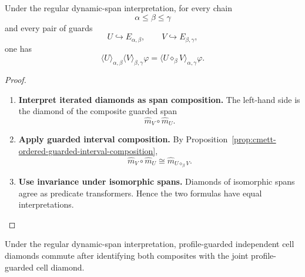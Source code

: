 \begin{theorem}
\label{thm:cmett-soundness-ordered-cell-composition}
    Under the regular dynamic-span interpretation, for every chain
    \[
        \alpha\leq\beta\leq\gamma
    \]
    and every pair of guards
    \[
        U\hookrightarrow E_{\alpha,\beta},
        \qquad
        V\hookrightarrow E_{\beta,\gamma},
    \]
    one has
    \[
        \langle U\rangle_{\alpha,\beta}
        \langle V\rangle_{\beta,\gamma}
        \varphi
        =
        \langle U\diamond_\beta V\rangle_{\alpha,\gamma}\varphi.
    \]
\end{theorem}

\begin{proof}
    \leavevmode
    \begin{enumerate}
        \item \textbf{Interpret iterated diamonds as span composition.}
        The left-hand side is the diamond of the composite guarded span
        \[
            \widehat m_V\circ\widehat m_U.
        \]

        \item \textbf{Apply guarded interval composition.}
        By Proposition~\ref{prop:cmett-ordered-guarded-interval-composition},
        \[
            \widehat m_V\circ\widehat m_U
            \cong
            \widehat m_{U\diamond_\beta V}.
        \]

        \item \textbf{Use invariance under isomorphic spans.}
        Diamonds of isomorphic spans agree as predicate transformers. Hence
        the two formulas have equal interpretations.
    \end{enumerate}
\end{proof}

\begin{corollary}
\label{cor:cmett-soundness-profile-guarded-commutation}
    Under the regular dynamic-span interpretation, profile-guarded independent
    cell diamonds commute after identifying both composites with the joint
    profile-guarded cell diamond.
\end{corollary}

